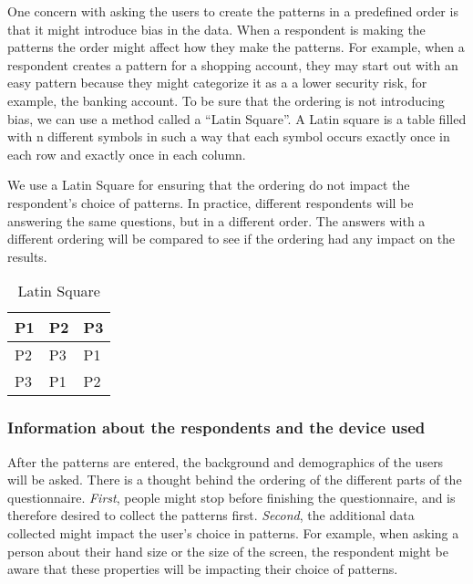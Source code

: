     One concern with asking the users to create the patterns in a predefined order is that it might introduce bias in the data. When a respondent is making the patterns the order might affect how they make the patterns. For example, when a respondent creates a pattern for a shopping account, they may start out with an easy pattern because they might categorize it as a a lower security risk, for example, the banking account. To be sure that the ordering is not introducing bias, we can use a method called a ``Latin Square''. A Latin square is a table filled with n different symbols in such a way that each symbol occurs exactly once in each row and exactly once in each column.

    We use a Latin Square for ensuring that the ordering do not impact the respondent's choice of patterns. In practice, different respondents will be answering the same questions, but in a different order. The answers with a different ordering will be compared to see if the ordering had any impact on the results. 

    \begin{table}[H]
      \centering
      \begin{tabular}{| m{1cm} | m{1cm} | m{1cm} |}
        \hline
        P1 & P2 & P3 \\ \hline
        P2 & P3 & P1 \\ \hline
        P3 & P1 & P2 \\ \hline
      \end{tabular}
      \caption{Latin Square}
    \end{table}

    \subsubsection*{Information about the respondents and the device used}
    After the patterns are entered, the background and demographics of the users will be asked. There is a thought behind the ordering of the different parts of the questionnaire. {\it First}, people might stop before finishing the questionnaire, and is therefore desired to collect the patterns first. {\it Second}, the additional data collected might impact the user's choice in patterns. For example, when asking a person about their hand size or the size of the screen, the respondent might be aware that these properties will be impacting their choice of patterns.





